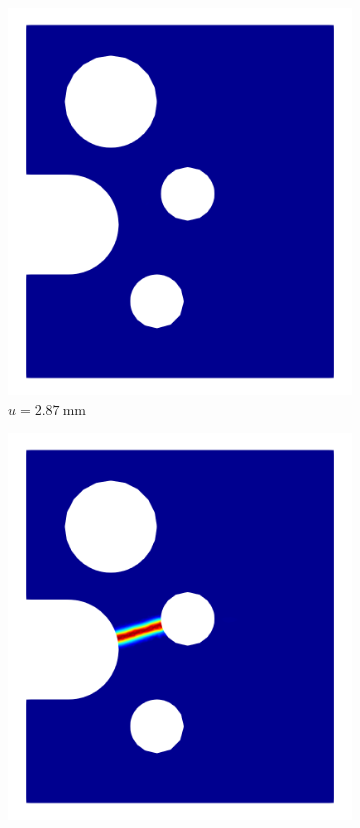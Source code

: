 \begin{figure}[!htb]
  \centering
  \begin{subfigure}{0.17\textwidth}
    \centering
    \includegraphics[width=\textwidth,scale=0.5]{Chapter5/figures/SFC/d_1}
    \caption{$u = \SI{2.87}{\milli\meter}$}
    \label{fig: Chapter5/SFC/d_1}
  \end{subfigure}
  \hspace{0.03\textwidth}
  \begin{subfigure}{0.17\textwidth}
    \centering
    \includegraphics[width=\textwidth,scale=0.5]{Chapter5/figures/SFC/d_2}

\end{subfigure}
\end{figure}
